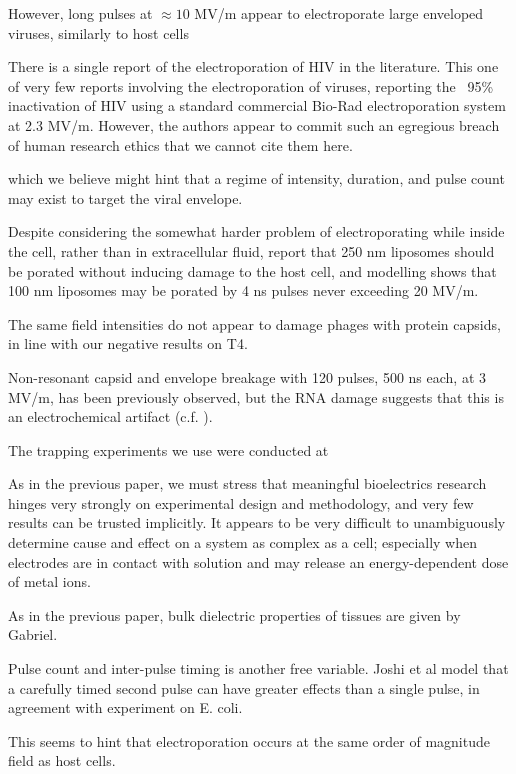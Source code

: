 \documentclass[fleqn,10pt]{paper}
\begin{document}
However, long pulses at $\approx10$ MV/m appear to electroporate large enveloped viruses, similarly to host cells\cite{AC2017}

There is a single report of the electroporation of HIV in the literature. This one of very few reports involving the electroporation of viruses, reporting the ~95\% inactivation of HIV  using a standard commercial Bio-Rad electroporation system at 2.3 MV/m. However, the authors appear to commit such an egregious breach of human research ethics that we cannot cite them here.

 which we believe might hint that a regime of intensity, duration, and pulse count may exist to target the viral envelope. 
 
Despite considering the somewhat harder problem of electroporating while inside the cell, rather than in extracellular fluid, \cite{Electroporation2013} report that 250 nm liposomes should be porated without inducing damage to the host cell, and modelling shows that 100 nm liposomes may be porated by 4 ns pulses never exceeding 20 MV/m. 

The same field intensities do not appear to damage phages with protein capsids\cite{Manipulation2013}, in line with our negative results on T4.

Non-resonant capsid and envelope breakage with 120 pulses, 500 ns each, at 3 MV/m, has been previously observed\cite{Inactivation1990}, but the RNA damage suggests that this is an electrochemical artifact \cite{Formation1996} (c.f. \cite{Microwave1987}). 

The trapping experiments we use were conducted at 

As in the previous paper, we must stress that meaningful bioelectrics research hinges very strongly on experimental design and methodology, and very few results can be trusted implicitly. It appears to be very difficult to unambiguously determine cause and effect on a system as complex as a cell; especially when electrodes are in contact with solution and may release an energy-dependent dose of metal ions.




As in the previous paper, bulk dielectric properties of tissues are given by Gabriel. 


Pulse count and inter-pulse timing is another free variable. Joshi et al \cite{Selfconsistent2001} model that a carefully timed second pulse can have greater effects than a single pulse, in agreement with experiment on E. coli.

This seems to hint that electroporation occurs at the same order of magnitude field as host cells.
\end{document}
